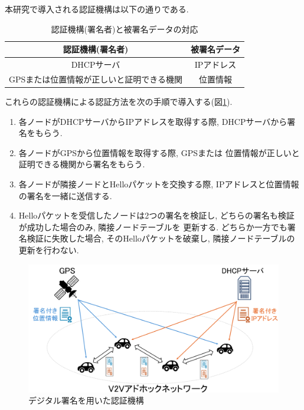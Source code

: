 \indent 本研究で導入される認証機構は以下の通りである.
\setlength{\tabcolsep}{30pt}
\begin{longtable}{cc}
  \caption{認証機構(署名者)と被署名データの対応}
  \endfirsthead
  \hline
  \multicolumn{1}{c}{認証機構(署名者)} & \multicolumn{1}{c}{被署名データ} \\ \hline \hline
  DHCPサーバ & IPアドレス \\
  GPSまたは位置情報が正しいと証明できる機関 & 位置情報 \\ \hline
\end{longtable}
\vspace{2em}
\indent これらの認証機構による認証方法を次の手順で導入する(図\ref{fig:introduce}).
\begin{enumerate}
  \item 各ノードがDHCPサーバからIPアドレスを取得する際, 
  DHCPサーバから署名をもらう.
  \item 各ノードがGPSから位置情報を取得する際, GPSまたは
  位置情報が正しいと証明できる機関から署名をもらう.
  \item 各ノードが隣接ノードとHelloパケットを交換する際, 
  IPアドレスと位置情報の署名を一緒に送信する. 
  \item Helloパケットを受信したノードは2つの署名を検証し, 
  どちらの署名も検証が成功した場合のみ, 隣接ノードテーブルを
  更新する. どちらか一方でも署名検証に失敗した場合, 
  そのHelloパケットを破棄し, 隣接ノードテーブルの更新を行わない.
\end{enumerate}

\begin{figure}[h]
  \centering
  \includegraphics[scale=0.8]{figures/introduce.png}
  \caption{デジタル署名を用いた認証機構}
  \label{fig:introduce}
\end{figure}



